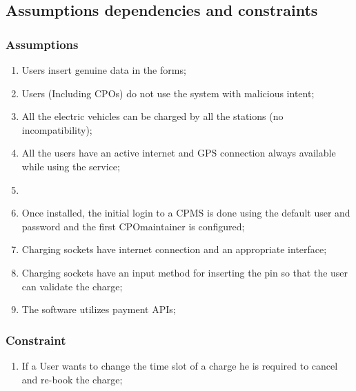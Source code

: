 \subsection{Assumptions dependencies and constraints}
\subsubsection{Assumptions}
\begin{enumerate}[label=\textbf{DA\arabic*}]
      \item Users insert genuine data in the forms;
      \item Users (Including \acp{CPO}) do not use the system with malicious intent;
      \item All the electric vehicles can be charged by all the stations (no incompatibility);
      \item All the users have an active internet and GPS connection always available while using the service;
      \item
      \item Once installed, the initial login to a \ac{CPMS} is done using the default user and password and the first \ac{CPO}maintainer is configured;
      \item Charging sockets have internet connection and an appropriate interface;
      \item Charging sockets have an input method for inserting the pin so that the user can validate the charge;
      \item The software utilizes payment \acp{API};
\end{enumerate}

\subsubsection{Constraint}
\begin{enumerate}[label=\textbf{C\arabic*}]
      \item If a User wants to change the time slot of a charge he is required to cancel and re-book the charge;
\end{enumerate}

\clearpage